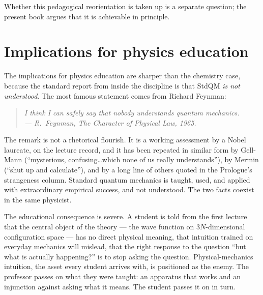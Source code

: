 Whether this pedagogical reorientation is taken up is a separate question; the present book argues that it is achievable in principle.

\section{Implications for physics education}\label{sec:physics-education}

The implications for physics education are sharper than the chemistry case, because the standard report from inside the discipline is that StdQM \emph{is not understood}. The most famous statement comes from Richard Feynman:

\begin{quote}
\itshape I think I can safely say that nobody understands quantum mechanics.\\
\normalfont\hfill --- R.~Feynman, \emph{The Character of Physical Law}, 1965.
\end{quote}

The remark is not a rhetorical flourish. It is a working assessment by a Nobel laureate, on the lecture record, and it has been repeated in similar form by Gell-Mann (``mysterious, confusing\ldots which none of us really understands''), by Mermin (``shut up and calculate''), and by a long line of others quoted in the Prologue's strangeness column. Standard quantum mechanics is taught, used, and applied with extraordinary empirical success, and not understood. The two facts coexist in the same physicist.

The educational consequence is severe. A student is told from the first lecture that the central object of the theory --- the wave function on $3N$-dimensional configuration space --- has no direct physical meaning, that intuition trained on everyday mechanics will mislead, that the right response to the question ``but what is actually happening?'' is to stop asking the question. Physical-mechanics intuition, the asset every student arrives with, is positioned as the enemy. The professor passes on what they were taught: an apparatus that works and an injunction against asking what it means. The student passes it on in turn.

